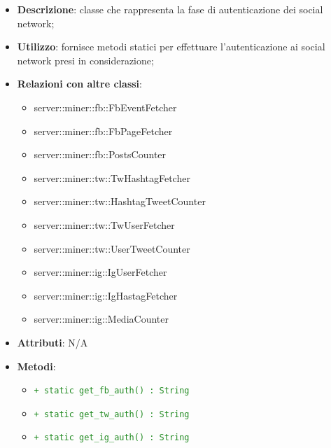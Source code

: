 				\begin{itemize}
				\item \textbf{Descrizione}: classe che rappresenta la fase di autenticazione dei social network;
				\item \textbf{Utilizzo}: fornisce metodi statici per effettuare l'autenticazione ai social network presi in considerazione;
				\item \textbf{Relazioni con altre classi}:
					\begin{itemize}
						\item server::miner::fb::FbEventFetcher
						\item server::miner::fb::FbPageFetcher
						\item server::miner::fb::PostsCounter
						\item server::miner::tw::TwHashtagFetcher
						\item server::miner::tw::HashtagTweetCounter
						\item server::miner::tw::TwUserFetcher
						\item server::miner::tw::UserTweetCounter
						\item server::miner::ig::IgUserFetcher
						\item server::miner::ig::IgHastagFetcher
						\item server::miner::ig::MediaCounter
					\end{itemize}
				\item \textbf{Attributi}: N/A
				\item \textbf{Metodi}:
					\begin{itemize}
						\item \textcolor{forestgreen}{\texttt{+ static get\_fb\_auth() : String}}
						\item \textcolor{forestgreen}{\texttt{+ static get\_tw\_auth() : String}}
						\item \textcolor{forestgreen}{\texttt{+ static get\_ig\_auth() : String}}
					\end{itemize}
			\end{itemize}


